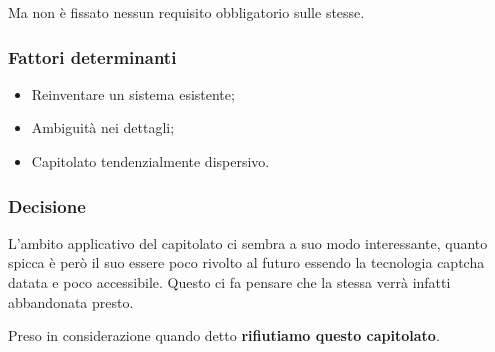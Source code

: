 Ma non è fissato nessun requisito obbligatorio sulle stesse.

\subsubsection{Fattori determinanti}
\begin{itemize}
    \item Reinventare un sistema esistente;
    \item Ambiguità nei dettagli;
    \item Capitolato tendenzialmente dispersivo.
\end{itemize}

\subsubsection{Decisione}
L'ambito applicativo del capitolato ci sembra a suo modo interessante, quanto spicca è però il suo essere poco rivolto al futuro essendo la tecnologia captcha datata e poco accessibile. Questo ci fa pensare che la stessa verrà infatti abbandonata presto.

Preso in considerazione quando detto \textbf{rifiutiamo questo capitolato}.
